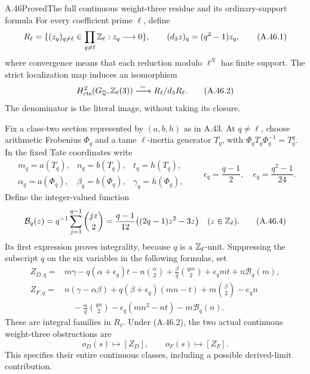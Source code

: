 \begin{statement}{A.46}{Proved}{The full continuous weight-three residue and its ordinary-support formula}
For every coefficient prime $\ell$, define
\[
 R_\ell=\{(z_q)_{q\ne\ell}\in\prod_{q\ne\ell}\mathbb Z_\ell:
                         z_q\longrightarrow0\},\qquad
 (d_3z)_q=(q^2-1)z_q,
 \tag{A.46.1}
\]
where convergence means that each reduction modulo $\ell^N$
has finite support.  The strict localization map induces an
isomorphism
\[
 H^2_{\rm cts}(G_\mathbb Q,\mathbb Z_\ell(3))
            \xrightarrow{\ \sim\ }R_\ell/d_3R_\ell.
 \tag{A.46.2}
\]
The denominator is the literal image, without taking its closure.

Fix a class-two section represented by $(a,b,h)$ as in A.43.
At $q\ne\ell$, choose arithmetic Frobenius $\Phi_q$ and a
tame $\ell$-inertia generator $T_q$, with
$\Phi_qT_q\Phi_q^{-1}=T_q^q$.  In the fixed Tate coordinates
write
\[
 \begin{array}{lll}
 m_q=a(T_q),&n_q=b(T_q),&t_q=h(T_q),\\
 \alpha_q=a(\Phi_q),&\beta_q=b(\Phi_q),&\gamma_q=h(\Phi_q),
 \end{array}
 \qquad
 \epsilon_q=\frac{q-1}{2},\quad
 e_q=\frac{q^2-1}{24}.
 \tag{A.46.3}
\]
Define the integer-valued function
\[
 \mathcal B_q(z)=q^{-1}\sum_{j=1}^{q-1}\binom{jz}{2}
       =\frac{q-1}{12}\bigl((2q-1)z^2-3z\bigr)
                  \quad(z\in\mathbb Z_\ell).
 \tag{A.46.4}
\]
Its first expression proves integrality, because $q$ is a
$\mathbb Z_\ell$-unit.  Suppressing the subscript $q$ on the six
variables in the following formulas, set
\[
 \begin{split}
 Z_{D,q}={}&m\gamma-q(\alpha+\epsilon_q)t
       -n\binom\alpha2+\frac{\beta}{q}\binom{qm}{2}
       +\epsilon_q mt+n\mathcal B_q(m),\\
 Z_{F,q}={}&n(\gamma-\alpha\beta)
       +q(\beta+\epsilon_q)(mn-t)+m\binom\beta2-e_q n\\
       &\hspace{1em}-\frac{\alpha}{q}\binom{qn}{2}
       -\epsilon_q(mn^2-nt)-m\mathcal B_q(n).
 \end{split}
 \tag{A.46.5}
\]
These are integral families in $R_\ell$.  Under (A.46.2),
the two actual continuous weight-three obstructions are
\[
                   o_D(s)\longmapsto[Z_D],\qquad
                   o_F(s)\longmapsto[Z_F].
 \tag{A.46.6}
\]
This specifies their entire continuous classes, including a
possible derived-limit contribution.


\end{statement}
